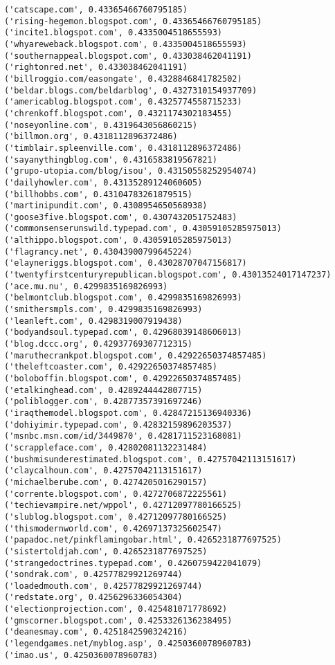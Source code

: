 \documentclass[11pt]{article}
\begin{document}
\begin{Verbatim}[commandchars=\\\{\}]
('catscape.com', 0.43365466760795185)
('rising-hegemon.blogspot.com', 0.43365466760795185)
('incite1.blogspot.com', 0.4335004518655593)
('whyareweback.blogspot.com', 0.4335004518655593)
('southernappeal.blogspot.com', 0.433038462041191)
('rightonred.net', 0.433038462041191)
('billroggio.com/easongate', 0.4328846841782502)
('beldar.blogs.com/beldarblog', 0.4327310154937709)
('americablog.blogspot.com', 0.4325774558715233)
('chrenkoff.blogspot.com', 0.4321174302183455)
('noseyonline.com', 0.4319643056860215)
('billmon.org', 0.4318112896372486)
('timblair.spleenville.com', 0.4318112896372486)
('sayanythingblog.com', 0.4316583819567821)
('grupo-utopia.com/blog/isou', 0.43150558252954074)
('dailyhowler.com', 0.43135289124060605)
('billhobbs.com', 0.43104783261879515)
('martinipundit.com', 0.4308954650568938)
('goose3five.blogspot.com', 0.4307432051752483)
('commonsenserunswild.typepad.com', 0.43059105285975013)
('althippo.blogspot.com', 0.43059105285975013)
('flagrancy.net', 0.43043900799645224)
('elayneriggs.blogspot.com', 0.43028707047156817)
('twentyfirstcenturyrepublican.blogspot.com', 0.43013524017147237)
('ace.mu.nu', 0.4299835169826993)
('belmontclub.blogspot.com', 0.4299835169826993)
('smithersmpls.com', 0.4299835169826993)
('leanleft.com', 0.4298319007919438)
('bodyandsoul.typepad.com', 0.42968039148606013)
('blog.dccc.org', 0.42937769307712315)
('maruthecrankpot.blogspot.com', 0.42922650374857485)
('theleftcoaster.com', 0.42922650374857485)
('boloboffin.blogspot.com', 0.42922650374857485)
('etalkinghead.com', 0.4289244442807715)
('poliblogger.com', 0.42877357391697246)
('iraqthemodel.blogspot.com', 0.42847215136940336)
('dohiyimir.typepad.com', 0.42832159896203537)
('msnbc.msn.com/id/3449870', 0.4281711523168081)
('scrappleface.com', 0.42802081132231484)
('bushmisunderestimated.blogspot.com', 0.42757042113151617)
('claycalhoun.com', 0.42757042113151617)
('michaelberube.com', 0.4274205016290157)
('corrente.blogspot.com', 0.4272706872225561)
('techievampire.net/wppol', 0.42712097780166525)
('slublog.blogspot.com', 0.42712097780166525)
('thismodernworld.com', 0.42697137325602547)
('papadoc.net/pinkflamingobar.html', 0.4265231877697525)
('sistertoldjah.com', 0.4265231877697525)
('strangedoctrines.typepad.com', 0.4260759422041079)
('sondrak.com', 0.42577829921269744)
('loadedmouth.com', 0.42577829921269744)
('redstate.org', 0.4256296336054304)
('electionprojection.com', 0.425481071778692)
('gmscorner.blogspot.com', 0.4253326136238495)
('deanesmay.com', 0.4251842590324216)
('legendgames.net/myblog.asp', 0.4250360078960783)
('imao.us', 0.4250360078960783)

\end{Verbatim}
\end{document}
